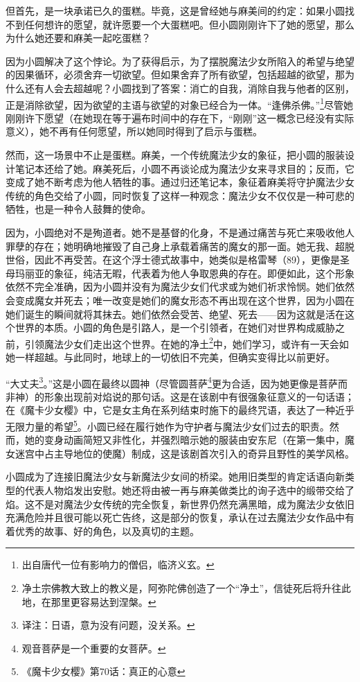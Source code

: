 但首先，是一块承诺已久的蛋糕。毕竟，这是曾经她与麻美间的约定：如果小圆找不到任何想许的愿望，就许愿要一个大蛋糕吧。但小圆刚刚许下了她的愿望，那么为什么她还要和麻美一起吃蛋糕？

因为小圆解决了这个悖论。为了获得启示，为了摆脱魔法少女所陷入的希望与绝望的因果循环，必须舍弃一切欲望。但如果舍弃了所有欲望，包括超越的欲望，那为什么还有人会去超越呢？小圆找到了答案：消亡的自我，消除自我与他者的区别，正是消除欲望，因为欲望的主语与欲望的对象已经合为一体。“逢佛杀佛。”\footnote{出自唐代一位有影响力的僧侣，临济义玄。}\cite{ref71}尽管她刚刚许下愿望（在她现在等于遍布时间中的存在下，“刚刚”这一概念已经没有实际意义），她不再有任何愿望，所以她同时得到了启示与蛋糕。

然而，这一场景中不止是蛋糕。麻美，一个传统魔法少女的象征，把小圆的服装设计笔记本还给了她。麻美死后，小圆不再谈论成为魔法少女来寻求目的；反而，它变成了她不断考虑为他人牺牲的事。通过归还笔记本，象征着麻美将守护魔法少女传统的角色交给了小圆，同时恢复了这样一种观念：魔法少女不仅仅是一种可悲的牺牲，也是一种令人鼓舞的使命。

因为，小圆绝对不是殉道者。她不是基督的化身，不是通过痛苦与死亡来吸收他人罪孽的存在；她明确地摧毁了自己身上承载着痛苦的魔女的那一面。她无我、超脱世俗，因此不再受苦。在这个浮士德式故事中，她类似是格雷琴（89），更像是圣母玛丽亚的象征，纯洁无暇，代表着为他人争取恩典的存在。即便如此，这个形象依然不完全准确，因为小圆并没有为魔法少女们代求或为她们祈求怜悯。她们依然会变成魔女并死去；唯一改变是她们的魔女形态不再出现在这个世界，因为小圆在她们诞生的瞬间就将其抹去。她们依然会受苦、绝望、死去——因为这就是活在这个世界的本质。小圆的角色是引路人，是一个引领者，在她们对世界构成威胁之前，引领魔法少女们走出这个世界。在她的净土\footnote{净土宗佛教大致上的教义是，阿弥陀佛创造了一个“净土”，信徒死后将升往此地，在那里更容易达到涅槃。}\cite{ref73}中，她们学习，或许有一天会如她一样超越。与此同时，地球上的一切依旧不完美，但确实变得比以前更好。

“大丈夫\footnote{译注：日语，意为没有问题，没关系。}。”这是小圆在最终以圆神（尽管圆菩萨\footnote{观音菩萨是一个重要的女菩萨。}\cite{ref73}更为合适，因为她更像是菩萨而非神）的形象出现前对焰说的那句话。这是在该剧中有很强象征意义的一句话语；在《魔卡少女樱》中，它是女主角在系列结束时施下的最终咒语，表达了一种近乎无限力量的希望\footnote{《魔卡少女樱》第70话：真正的心意}。小圆已经在履行她作为守护者与魔法少女们过去的职责。然而，她的变身动画简短又非性化，并强烈暗示她的服装由安东尼（在第一集中，魔女迷宫中占主导地位的使魔）制成，这是该剧首次引入的奇异且野性的美学风格。

小圆成为了连接旧魔法少女与新魔法少女间的桥梁。她用旧类型的肯定话语向新类型的代表人物焰发出安慰。她还将由被一再与麻美做类比的询子选中的缎带交给了焰。这不是对魔法少女传统的完全恢复，新世界仍然充满黑暗，成为魔法少女依旧充满危险并且很可能以死亡告终，这是部分的恢复，承认在过去魔法少女作品中有着优秀的故事、好的角色，以及真切的主题。

